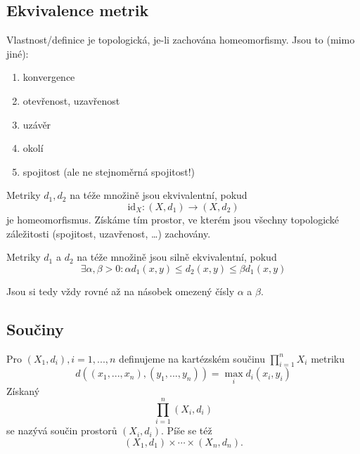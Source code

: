 \documentclass[../main.tex]{subfiles}
\begin{document}
\subsection{Ekvivalence metrik}
\begin{definition}
	Vlastnost/definice je topologická, je-li zachována homeomorfismy. Jsou to (mimo jiné):
	\begin{enumerate}
		\item konvergence
		\item otevřenost, uzavřenost
		\item uzávěr
		\item okolí
		\item spojitost (ale ne stejnoměrná spojitost!)
	\end{enumerate}
\end{definition}

\begin{definition}
	Metriky $d_1, d_2$ na téže množině jsou ekvivalentní, pokud $$\mathrm{id}_X : \left(X, d_1\right) \to (X, d_2)$$ je homeomorfismus. Získáme tím prostor, ve kterém jsou všechny topologické záležitosti (spojitost, uzavřenost, \ldots) zachovány.
\end{definition}


\begin{definition}
	Metriky $d_1$ a $d_2$ na téže množině jsou silně ekvivalentní, pokud
	\[\exists \alpha , \beta > 0: \alpha d_1(x,y) \leq d_2(x,y) \leq \beta d_1(x,y)\]

	Jsou si tedy vždy rovné až na násobek omezený čísly \(\alpha\) a \(\beta\).
\end{definition}

\subsection{Součiny}

\begin{definition}[Součin]
	Pro $(X_1,d_i), i = 1,...,n$ definujeme na kartézském součinu $\prod^n_{i=1}X_i$ metriku
	\[d((x_1,...,x_n),(y_1,...,y_n)) = \max_i d_i(x_i,y_i)\]
	Získaný
	\[\prod^n_{i=1}(X_i,d_i)\]
	se nazývá součin prostorů $(X_i, d_i)$. Píše se též 
	\[(X_1,d_1) \times \cdots \times (X_n,d_n).\]
\end{definition}

\end{document}
